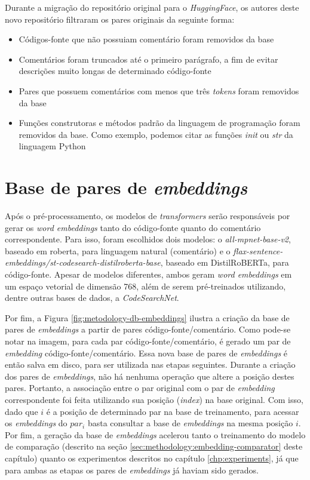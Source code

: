 Durante a migração do repositório original para o \textit{HuggingFace}, os autores deste novo repositório filtraram os pares originais da seguinte forma:
\begin{itemize}
    \item Códigos-fonte que não possuiam comentário foram removidos da base
    \item Comentários foram truncados até o primeiro parágrafo, a fim de evitar descrições muito longas de determinado código-fonte
    \item Pares que possuem comentários com menos que três \textit{tokens} foram removidos da base
    \item Funções construtoras e métodos padrão da linguagem de programação foram removidos da base. Como exemplo, podemos citar as funções \textit{init} ou \textit{str} da linguagem Python
\end{itemize}

\section{Base de pares de \textit{embeddings}}
\label{sec:methodology:encoders}
Após o pré-processamento, os modelos de \textit{transformers} serão responsáveis por gerar os \textit{word embeddings} tanto do código-fonte quanto do comentário correspondente. Para isso, foram escolhidos dois modelos: o \textit{all-mpnet-base-v2}, baseado em \gls{roberta}, para linguagem natural (comentário) e o \textit{flax-sentence-embeddings/st-codesearch-distilroberta-base}, baseado em DistilRoBERTa, para código-fonte. Apesar de modelos diferentes, ambos geram \textit{word embeddings} em um espaço vetorial de dimensão 768, além de serem pré-treinados utilizando, dentre outras bases de dados, a \textit{CodeSearchNet}.

Por fim, a Figura \ref{fig:metodology-db-embeddings} ilustra a criação da base de pares de \textit{embeddings} a partir de pares código-fonte/comentário. Como pode-se notar na imagem, para cada par código-fonte/comentário, é gerado um par de \textit{embedding} código-fonte/comentário. Essa nova base de pares de \textit{embeddings} é então salva em disco, para ser utilizada nas etapas seguintes. Durante a criação dos pares de \textit{embeddings}, não há nenhuma operação que altere a posição destes pares. Portanto, a associação entre o par original com o par de \textit{embedding} correspondente foi feita utilizando sua posição (\textit{index}) na base original. Com isso, dado que $i$ é a posição de determinado par na base de treinamento, para acessar os \textit{embeddings} do $par_i$ basta consultar a base de \textit{embeddings} na mesma posição $i$. Por fim, a geração da base de \textit{embeddings} acelerou tanto o treinamento do modelo de comparação (descrito na seção \ref{sec:methodology:embedding-comparator} deste capítulo) quanto os experimentos descritos no capítulo \ref{chp:experiments}, já que para ambas as etapas os pares de \textit{embeddings} já haviam sido gerados.

